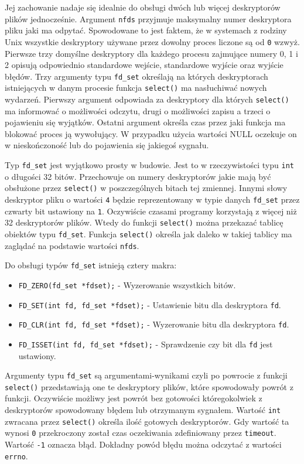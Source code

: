 \documentclass[10pt]{scrartcl}
\begin{document}
Jej zachowanie nadaje się idealnie do obsługi dwóch lub więcej deskryptorów plików jednocześnie. Argument \texttt{nfds} przyjmuje maksymalny numer deskryptora pliku jaki ma odpytać. Spowodowane to jest faktem, że w systemach z rodziny Unix wszystkie deskryptory używane przez dowolny proces liczone są od \texttt{0} wzwyż. Pierwsze trzy domyślne deskryptory dla każdego procesu zajmujące numery 0, 1 i 2 opisują odpowiednio standardowe wejście, standardowe wyjście oraz wyjście błędów. Trzy argumenty typu \texttt{fd\_set} określają na których deskryptorach istniejących w danym procesie funkcja \texttt{select()} ma nasłuchiwać nowych wydarzeń. Pierwszy argument odpowiada za deskryptory dla których \texttt{select()} ma informować o możliwości odczytu, drugi o możliwości zapisu a trzeci o pojawieniu się wyjątków. Ostatni argument określa czas przez jaki funkcja ma blokować proces ją wywołujący. W przypadku użycia wartości NULL oczekuje on w nieskończoność lub do pojawienia się jakiegoś sygnału.

Typ \texttt{fd\_set} jest wyjątkowo prosty w budowie. Jest to w rzeczywistości typu \texttt{int} o długości 32 bitów. Przechowuje on numery deskryptorów jakie mają być obsłużone przez \texttt{select()} w poszczególnych bitach tej zmiennej. Innymi słowy deskryptor pliku o wartości \texttt{4} będzie reprezentowany w typie danych \texttt{fd\_set} przez czwarty bit ustawiony na \texttt{1}. Oczywiście czasami programy korzystają z więcej niż 32 deskryptorów plików. Wtedy do funkcji \texttt{select()} można przekazać tablicę obiektów typu \texttt{fd\_set}. Funkcja \texttt{select()} określa jak daleko w takiej tablicy ma zaglądać na podstawie wartości \texttt{nfds}.

Do obsługi typów \texttt{fd\_set} istnieją cztery makra:

\begin{itemize}
\itemsep1pt\parskip0pt
\item
  \texttt{FD\_ZERO(fd\_set *fdset);} - Wyzerowanie wszystkich bitów.
\item
  \texttt{FD\_SET(int fd, fd\_set *fdset);} - Ustawienie bitu dla
  deskryptora \texttt{fd}.
\item
  \texttt{FD\_CLR(int fd, fd\_set *fdset);} - Wyzerowanie bitu dla
  deskryptora \texttt{fd}.
\item
  \texttt{FD\_ISSET(int fd, fd\_set *fdset);} - Sprawdzenie czy bit dla \texttt{fd} jest ustawiony.
\end{itemize}

Argumenty typu \texttt{fd\_set} są argumentami-wynikami czyli po powrocie z funkcji \texttt{select()} przedstawiają one te deskryptory plików, które spowodowały powrót z funkcji. Oczywiście możliwy jest powrót bez gotowości któregokolwiek z deskryptorów spowodowany błędem lub otrzymanym sygnałem. Wartość \texttt{int} zwracana przez \texttt{select()} określa ilość gotowych deskryptorów. Gdy wartość ta wynosi \texttt{0} przekroczony został czas oczekiwania zdefiniowany przez \texttt{timeout}. Wartość \texttt{-1} oznacza błąd. Dokładny powód błędu można odczytać z wartości \texttt{errno}.
\end{document}

